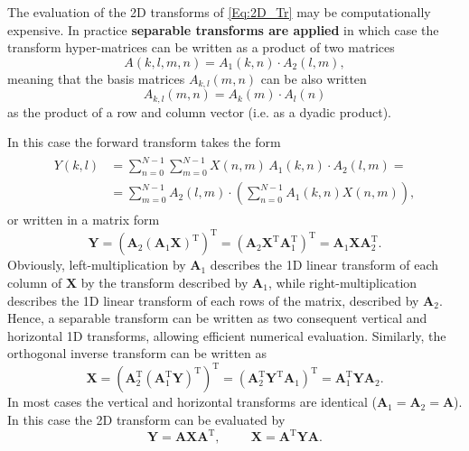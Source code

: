 \vspace{3mm}
The evaluation of the 2D transforms of \eqref{Eq:2D_Tr} may be computationally expensive.
In practice \textbf{separable transforms are applied} in which case the transform hyper-matrices can be written as a product of two matrices
\begin{equation}
A(k,l,m,n) = A_1(k,n) \cdot A_2(l,m),
\end{equation}
meaning that the basis matrices $ A_{k,l}(m,n)$ can be also written
\begin{equation}
A_{k,l}(m,n) = A_{k}(m) \cdot A_{l}(n)
\end{equation}
as the product of a row and column vector (i.e. as a dyadic product).

In this case the forward transform takes the form 
\begin{align}
\begin{split}
Y(k,l) &= \sum_{n=0}^{N-1} \sum_{m=0}^{N-1} X(n,m) \,  A_1(k,n) \cdot A_2(l,m) = \\
&= \sum_{m=0}^{N-1} A_2(l,m) \cdot \left( \sum_{n=0}^{N-1} A_1(k,n)  X(n,m) \right),
\end{split}
\end{align}
or written in a matrix form
\begin{equation}
\mathbf{Y} = \left( \mathbf{A}_2 \left( \mathbf{A}_1 \mathbf{X} \right)^{\mathrm{T}} \right)^{\mathrm{T}}= 
\left( \mathbf{A}_2 \mathbf{X}^{\mathrm{T}} \mathbf{A}_1^{\mathrm{T}} \right)^{\mathrm{T}} = 
\mathbf{A}_1 \mathbf{X} \mathbf{A}_2^{\mathrm{T}} .
\end{equation}
Obviously, left-multiplication by $\mathbf{A}_1$ describes the 1D linear transform of each column of $\mathbf{X}$ by the transform described by $\mathbf{A}_1$, while right-multiplication describes the 1D linear transform of each rows of the matrix, described by $\mathbf{A}_2$.
Hence, a separable transform can be written as two consequent vertical and horizontal 1D transforms, allowing efficient numerical evaluation.
Similarly, the orthogonal inverse transform can be written as
\begin{equation}
\mathbf{X} = \left( \mathbf{A}_2^{\mathrm{T}} \left( \mathbf{A}_1^{\mathrm{T}} \mathbf{Y} \right)^{\mathrm{T}} \right)^{\mathrm{T}}= 
\left( \mathbf{A}_2^{\mathrm{T}} \mathbf{Y}^{\mathrm{T}} \mathbf{A}_1 \right)^{\mathrm{T}} = 
\mathbf{A}_1^{\mathrm{T}} \mathbf{Y} \mathbf{A}_2.
\end{equation}
In most cases the vertical and horizontal transforms are identical ($\mathbf{A}_1 = \mathbf{A}_2 = \mathbf{A}$).
In this case the 2D transform can be evaluated by 
\begin{equation}
\mathbf{Y} = \mathbf{A} \mathbf{X} \mathbf{A}^{\mathrm{T}}, \hspace{1cm} 
\mathbf{X} = \mathbf{A}^{\mathrm{T}} \mathbf{Y} \mathbf{A}.
\label{eq:2D_eval}
\end{equation}

